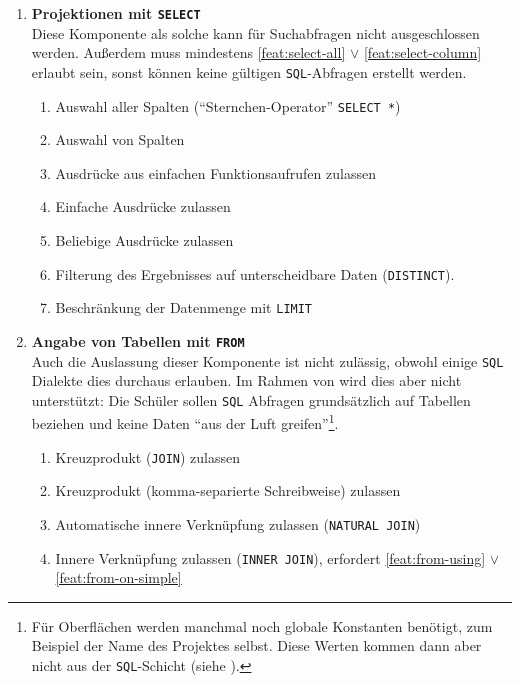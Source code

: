\begin{enumerate}
\item \textbf{Projektionen mit \texttt{SELECT}} \\
  Diese Komponente als solche kann für Suchabfragen nicht ausgeschlossen werden. Außerdem muss mindestens \ref{feat:select-all} $\lor$ \ref{feat:select-column} erlaubt sein, sonst können keine gültigen \texttt{SQL}-Abfragen erstellt werden.
  \begin{enumerate}[noitemsep]
  \item \label{feat:select-all} Auswahl aller Spalten ("`Sternchen-Operator"' \texttt{SELECT *})
  \item \label{feat:select-column} Auswahl von Spalten
  \item \label{feat:select-single-function} Ausdrücke aus einfachen Funktionsaufrufen zulassen
  \item \label{feat:select-simple-expression} Einfache Ausdrücke zulassen
  \item \label{feat:select-expression} Beliebige Ausdrücke zulassen
  \item \label{feat:select-distinct} Filterung des Ergebnisses auf unterscheidbare Daten (\texttt{DISTINCT}).
  \item \label{feat:select-limit} Beschränkung der Datenmenge mit \texttt{LIMIT}
  \end{enumerate}
\item \textbf{Angabe von Tabellen mit \texttt{FROM}} \\
  Auch die Auslassung dieser Komponente ist nicht zulässig, obwohl einige \texttt{SQL} Dialekte dies durchaus erlauben. Im Rahmen von \idename{} wird dies aber nicht unterstützt: Die Schüler sollen \texttt{SQL} Abfragen grundsätzlich auf Tabellen beziehen und keine Daten "`aus der Luft greifen"'\footnote{Für Oberflächen werden manchmal noch globale Konstanten benötigt, zum Beispiel der Name des Projektes selbst. Diese Werten kommen dann aber nicht aus der \texttt{SQL}-Schicht (siehe ).}.
  \begin{enumerate}[noitemsep]
  \item \label{feat:from-cross-join} Kreuzprodukt (\texttt{JOIN}) zulassen
  \item \label{feat:from-cross-comma} Kreuzprodukt (komma-separierte Schreibweise) zulassen
  \item \label{feat:from-natural-join} Automatische innere Verknüpfung zulassen (\texttt{NATURAL JOIN})
  \item \label{feat:from-inner-join} Innere Verknüpfung zulassen (\texttt{INNER JOIN}), erfordert \ref{feat:from-using} $\lor$ \ref{feat:from-on-simple}

\end{enumerate}
\end{enumerate}

